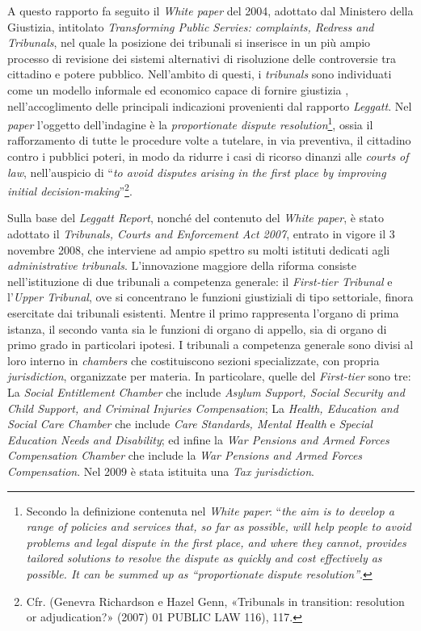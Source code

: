 \documentclass[12pt,it,a4paper,]{report}
\begin{document}
A questo rapporto fa seguito il \emph{White paper} del 2004, adottato
dal Ministero della Giustizia, intitolato \emph{Transforming Public
Servies: complaints, Redress and Tribunals}, nel quale la posizione dei
tribunali si inserisce in un più ampio processo di revisione dei sistemi
alternativi di risoluzione delle controversie tra cittadino e potere
pubblico. Nell'ambito di questi, i \emph{tribunals} sono individuati
come un modello informale ed economico capace di fornire giustizia ,
nell'accoglimento delle principali indicazioni provenienti dal rapporto
\emph{Leggatt}. Nel \emph{paper} l'oggetto dell'indagine è la
\emph{proportionate dispute resolution}\footnote{Secondo la definizione
  contenuta nel \emph{White paper}: ``\emph{the aim is to develop a
  range of policies and services that, so far as possible, will help
  people to avoid problems and legal dispute in the first place, and
  where they cannot, provides tailored solutions to resolve the dispute
  as quickly and cost effectively as possible. It can be summed up as
  ``proportionate dispute resolution''}.}, ossia il rafforzamento di
tutte le procedure volte a tutelare, in via preventiva, il cittadino
contro i pubblici poteri, in modo da ridurre i casi di ricorso dinanzi
alle \emph{courts of law}, nell'auspicio di ``\emph{to avoid disputes
arising in the first place by improving initial
decision-making}''\footnote{Cfr. (Genevra Richardson e Hazel Genn,
  {«Tribunals in transition: resolution or adjudication?»} (2007) 01
  PUBLIC LAW 116), 117.}.

Sulla base del \emph{Leggatt Report}, nonché del contenuto del
\emph{White paper}, è stato adottato il \emph{Tribunals, Courts and
Enforcement Act 2007}, entrato in vigore il 3 novembre 2008, che
interviene ad ampio spettro su molti istituti dedicati agli
\emph{administrative tribunals}. L'innovazione maggiore della riforma
consiste nell'istituzione di due tribunali a competenza generale: il
\emph{First-tier Tribunal} e l'\emph{Upper Tribunal}, ove si concentrano
le funzioni giustiziali di tipo settoriale, finora esercitate dai
tribunali esistenti. Mentre il primo rappresenta l'organo di prima
istanza, il secondo vanta sia le funzioni di organo di appello, sia di
organo di primo grado in particolari ipotesi. I tribunali a competenza
generale sono divisi al loro interno in \emph{chambers} che
costituiscono sezioni specializzate, con propria \emph{jurisdiction},
organizzate per materia. In particolare, quelle del \emph{First-tier}
sono tre: La \emph{Social Entitlement Chamber} che include \emph{Asylum
Support, Social Security and Child Support, and Criminal Injuries
Compensation}; La \emph{Health, Education and Social Care Chamber} che
include \emph{Care Standards, Mental Health} e \emph{Special Education
Needs and Disability}; ed infine la \emph{War Pensions and Armed Forces
Compensation Chamber} che include la \emph{War Pensions and Armed Forces
Compensation}. Nel 2009 è stata istituita una \emph{Tax jurisdiction}.
\end{document}
